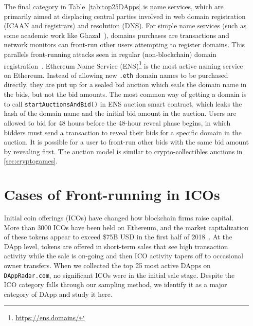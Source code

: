 The final category in Table~\ref{tab:top25DApps} is name services, which are primarily aimed at displacing central parties involved in web domain registration (\eg ICAAN and registrars) and resolution (\eg DNS). For simple name services (such as some academic work like Ghazal~\cite{moosavighazal}), domains purchases are transactions and network monitors can front-run other users attempting to register domains. This parallels front-running attacks seen in regular (non-blockchain) domain registration~\cite{sac022en33:online}. \textsf{Ethereum Name Service (ENS)}\footnote{\url{https://ens.domains/}} is the most active naming service on Ethereum. Instead of allowing new \texttt{.eth} domain names to be purchased directly, they are put up for a sealed bid auction which seals the domain name in the bids, but not the bid amounts. The most common way of getting a domain is to call \texttt{startAuctionsAndBid()} in ENS auction smart contract, which leaks the hash of the domain name and the initial bid amount in the auction. Users are allowed to bid for 48 hours before the 48-hour reveal phase begins, in which bidders must send a transaction to reveal their bids for a specific domain in the auction. It is possible for a user to front-run other bids with the same bid amount by revealing first. The auction model is similar to crypto-collectibles auctions in \ref{sec:cryptogames}.


\section{Cases of Front-running in ICOs}  \label{sec:ICOsfrontrunning}

Initial coin offerings (ICOs) have changed how blockchain firms raise capital. More than 3000 ICOs have been held on Ethereum, and the market capitalization of these tokens appear to exceed \$75B USD in the first half of 2018~\cite{zetzsche2018ico}. At the DApp level, tokens are offered in short-term sales that see high transaction activity while the sale is on-going and then ICO activity tapers off to occasional owner transfers. When we collected the top 25 most active DApps on \texttt{DAppRadar.com}, no significant ICOs were in the initial sale stage. Despite the ICO category falls through our sampling method, we identify it as a major category of DApp and study it here. 

